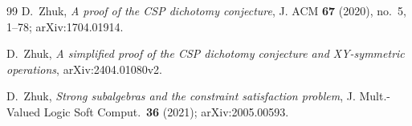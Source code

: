 \begin{thebibliography}{99}
 D.~Zhuk, \emph{A proof of the CSP dichotomy conjecture},
  J. ACM \textbf{67} (2020), no.~5, 1--78; arXiv:1704.01914.

 D.~Zhuk, \emph{A simplified proof of the CSP dichotomy
  conjecture and XY-symmetric operations}, arXiv:2404.01080v2.

 D.~Zhuk, \emph{Strong subalgebras and the constraint
  satisfaction problem}, J. Mult.-Valued Logic Soft Comput.\ \textbf{36} (2021);
  arXiv:2005.00593.

\end{thebibliography}
